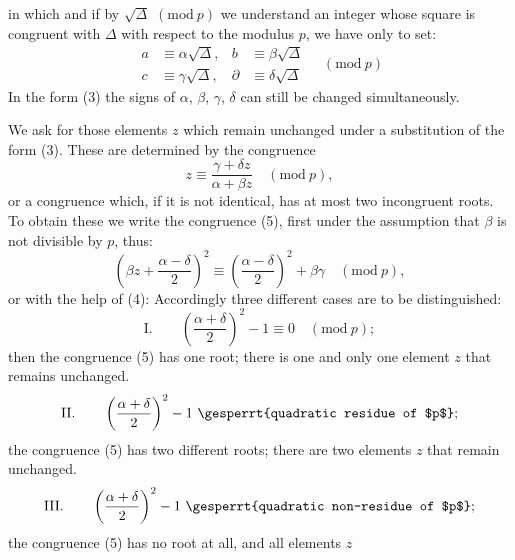 in which
and if by $\sqrt{\varDelta}$ $(\mathrm{mod}\ p)$ we understand an integer
whose square is congruent with $\varDelta$ with respect to the modulus
$p$, we have only to set:
\[
\begin{aligned}
a &\equiv \alpha\sqrt{\varDelta}, & b &\equiv \beta\sqrt{\varDelta}\\
c &\equiv \gamma\sqrt{\varDelta}, & \partial &\equiv \delta\sqrt{\varDelta}
\end{aligned}
\quad (\mathrm{mod}\ p)
\]
In the form (3) the signs of $\alpha$, $\beta$, $\gamma$, $\delta$ can
still be changed simultaneously.

We ask for those elements $z$ which remain unchanged under a substitution
of the form (3). These are determined by the congruence
\[
z \equiv \frac{\gamma+\delta z}{\alpha+\beta z} \quad (\mathrm{mod}\ p),
\]
or
a congruence which, if it is not identical, has at most two incongruent
roots. To obtain these we write the congruence (5), first under the
assumption that $\beta$ is not divisible by $p$, thus:
\[
\left(\beta z + \frac{\alpha-\delta}{2}\right)^2 \equiv \left(\frac{\alpha-\delta}{2}\right)^2 + \beta\gamma \quad (\mathrm{mod}\ p),
\]
or with the help of (4):
Accordingly three different cases are to be distinguished:
\[
\mathrm{I.} \qquad \left(\frac{\alpha+\delta}{2}\right)^2 - 1 \equiv 0 \quad (\mathrm{mod}\ p);
\]
then the congruence (5) has one root; there is one and
only one element $z$ that remains unchanged.
\[
\mathrm{II.} \qquad \left(\frac{\alpha+\delta}{2}\right)^2 - 1 \ \text{\gesperrt{quadratic residue of $p$}};
\]
the congruence (5) has two different roots; there are two
elements $z$ that remain unchanged.
\[
\mathrm{III.} \qquad \left(\frac{\alpha+\delta}{2}\right)^2 - 1 \ \text{\gesperrt{quadratic non-residue of $p$}};
\]
the congruence (5) has no root at all, and all elements $z$
